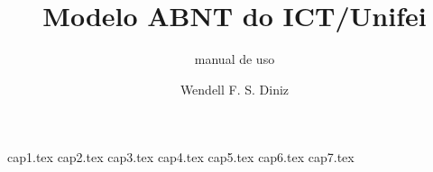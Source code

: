 \documentclass[12pt,a4paper,oneside]{book}
\title{Modelo ABNT do ICT/Unifei}
\subtitle{manual de uso}
\author{Wendell F. S. Diniz}
\begin{document}
\frontmatter


\maketitle

\folhaaprovacao

\makeabstracts


\listoffigures

\listoftables

%

\printglossary[type=\acronymtype,title={\acronymlistname}]

\printglossary[type=symbols,title={\symbolslistname}]

\tableofcontents

\mainmatter

{cap1.tex}
{cap2.tex}
{cap3.tex}
{cap4.tex}
{cap5.tex}
{cap6.tex}
{cap7.tex}

\printbibliography

\end{document}
